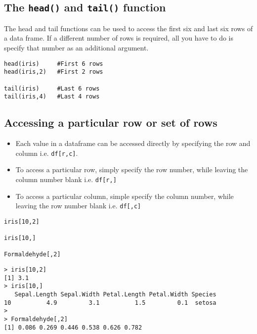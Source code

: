 \documentclass[12pt]{article}
\begin{document}

\subsection*{The \texttt{head()} and \texttt{tail()} function}
The head and tail functions can be used to access the first six and last six rows of a data frame. If a different number of rows is required, all you have to do is specify that number as an additional argument.
\begin{framed}
\begin{verbatim}
head(iris)     #First 6 rows
head(iris,2)   #First 2 rows

tail(iris)     #Last 6 rows
tail(iris,4)   #Last 4 rows
\end{verbatim}
\end{framed}

\newpage

\subsection*{Accessing a particular row or set of rows}

\begin{itemize}
\item Each value in a dataframe can be accessed directly by specifying the row and column i.e. \texttt{df[r,c]}.
\item To access a particular row, simply specify the row number, while leaving the column number blank i.e. \texttt{df[r,]}
\item To access a particular column, simple specify the column number, while leaving the row number blank i.e. \texttt{df[,c]}
\end{itemize}

\begin{framed}
\begin{verbatim}
iris[10,2]

iris[10,] 

Formaldehyde[,2]  
\end{verbatim}
\end{framed}

\begin{verbatim}
> iris[10,2]
[1] 3.1
> iris[10,] 
   Sepal.Length Sepal.Width Petal.Length Petal.Width Species
10          4.9         3.1          1.5         0.1  setosa
> 
> Formaldehyde[,2]  
[1] 0.086 0.269 0.446 0.538 0.626 0.782
\end{verbatim}
\end{document}
